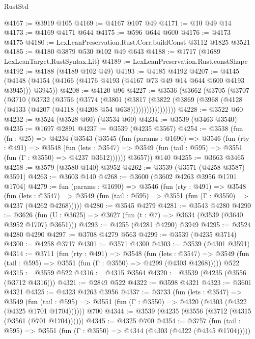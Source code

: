 \begin{lexlean}{RustStd}
\begin{coremodule}
@4167 := @3919 @105
@4169 := @4167 @107 @49
@4171 := @10 @49 @14
@4173 := @4169 @4171 @644
@4175 := @596 @644 @600
@4176 := @4173 @4175
@4180 := LexLeanPreservation.Rust.Corr.buildConst @3112 @1825 @3521
@4185 := @4180 @3879 @530 @102 @49 @643
@4188 := @1717 (@1689 LexLeanTarget.RustSyntax.Lit)
@4189 := LexLeanPreservation.Rust.constShape
@4192 := @4188 (@4189 @102 @49)
@4193 := @4185 @4192
@4207 := @4145 (@4148 (@4154 (@4166 (@4176 @4193 (@4167 @73 @49 @14 @644 @600 @4193 @3945))) @3945))
@4208 := @4120 @96
@4227 := @3536
    (@3662
      (@3705
        (@3707
          (@3710
            (@3732
              (@3756
                (@3774
                  (@3801
                    (@3817
                      (@3822
                        (@3869 (@3968 (@4128 (@4133 (@4207 (@4118 (@4208 @54 @638)))))))))))))))))
@4228 := @3522 @60
@4232 := @3524 (@3528 @60) (@3534 @60)
@4234 := @3539 (@3463 @3540)
@4235 := @1697 @2891
@4237 := @3539 (@4235 @3567)
@4254 := @3538
    (fun (fn : @25) =>
    @4234
      (@3543
        (@3545
          (fun (params : @1690) =>
          @3546
            (fun (rty : @491) =>
            @3548
              (fun (lets : @3547) =>
              @3549 (fun (tail : @595) => @3551 (fun (Γ : @3550) => @4237 @3612))))))
        @3657))
    @140
@4255 := @3663 @3465
@4258 := @3579 (@3580 @140) @3952
@4262 := @3539 (@3571 (@4258 @3587) @3591)
@4263 := @3603 @140
@4268 := @3600 (@3602 @4263 @3956 @1701 @1704)
@4279 := fun (params : @1690) =>
  @3546
    (fun (rty : @491) =>
    @3548
      (fun (lets : @3547) =>
      @3549 (fun (tail : @595) => @3551 (fun (Γ : @3550) => @4237 (@4262 @4268)))))
@4280 := @3545 @4279
@4281 := @3543 @4280
@4290 := @3626 (fun (U : @3625) => @3627 (fun (t : @7) => @3634 (@3539 (@3640 @3952 @1707) @3651)))
@4293 := @4255 (@4281 @4290) @3949
@4295 := @3524 @4280 @4290
@4297 := @3708 @4279 @563
@4299 := @3539 (@4235 @3714)
@4300 := @4258 @3717
@4301 := @3571 @4300
@4303 := @3539 (@4301 @3591)
@4314 := @3711
    (fun (rty : @491) =>
    @3548
      (fun (lets : @3547) =>
      @3549 (fun (tail : @595) => @3551 (fun (Γ : @3550) => @4299 (@4303 @4268)))))
    @522
@4315 := @3559 @522
@4316 := @4315 @3564
@4320 := @3539 (@4235 (@3556 (@3712 @4316)))
@4321 := @2849 @522
@4322 := @3598 @4321
@4323 := @3601 @4321
@4325 := @4323 @4263 @3956
@4337 := @3733
    (fun (lets : @3547) =>
    @3549
      (fun (tail : @595) => @3551 (fun (Γ : @3550) => @4320 (@4303 (@4322 (@4325 @1701 @1704))))))
    @700
@4344 := @3539 (@4235 (@3556 (@3712 (@4315 (@3561 (@701 @1704))))))
@4345 := @4325 @700
@4354 := @3757
    (fun (tail : @595) => @3551 (fun (Γ : @3550) => @4344 (@4303 (@4322 (@4345 @1704)))))

\end{coremodule}
\end{lexlean}
